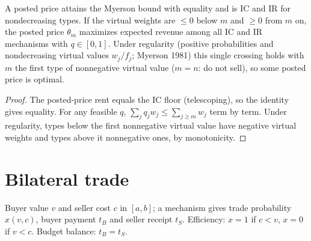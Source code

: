 \begin{theorem}
\label{thm:posted-price}
\leanok
{}
A posted price attains the Myerson bound with equality and is IC and IR for nondecreasing types. If the
virtual weights are $\le 0$ below $m$ and $\ge 0$ from $m$ on, the posted price $\theta_m$ maximizes expected
revenue among all IC and IR mechanisms with $q \in [0,1]$. Under regularity (positive probabilities and
nondecreasing virtual values $w_j/f_j$; Myerson 1981) this single crossing holds with $m$ the first type of
nonnegative virtual value ($m = n$: do not sell), so some posted price is optimal.
\end{theorem}
\begin{proof}
\leanok
The posted-price rent equals the IC floor (telescoping), so the identity gives equality. For any feasible $q$,
$\sum_j q_j w_j \le \sum_{j \ge m} w_j$ term by term. Under regularity, types below the first nonnegative virtual
value have negative virtual weights and types above it nonnegative ones, by monotonicity.
\end{proof}

\section{Bilateral trade}
\label{sec:bilateral-trade}

\begin{definition}
\label{def:trade-mech}
\leanok
Buyer value $v$ and seller cost $c$ in $[a,b]$; a mechanism gives trade probability $x(v,c)$, buyer payment
$t_B$ and seller receipt $t_S$. Efficiency: $x = 1$ if $c < v$, $x = 0$ if $v < c$. Budget balance: $t_B = t_S$.
\end{definition}

